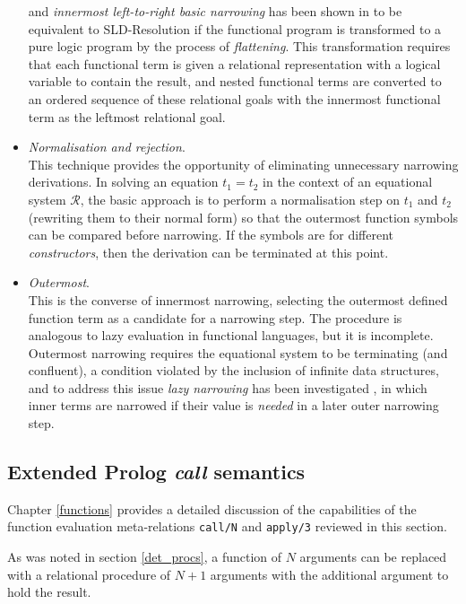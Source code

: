 \begin{itemize}
{  and \textit{innermost left-to-right basic narrowing} has been shown in 
  \cite{BGM88} to be equivalent to SLD-Resolution if the functional program is
  transformed to a pure logic program by the process of \textit{flattening}.  This
  transformation requires that each functional term is given a relational representation
  with a logical variable to contain the result, and nested functional terms are
  converted to an ordered sequence of these relational goals with the innermost functional
  term as the leftmost relational goal.
  }
\item{\textit{Normalisation and rejection}.\\
  This technique provides the opportunity of eliminating unnecessary narrowing
  derivations.  In solving an equation $t_1 = t_2$ in the context of an
  equational system $\mathcal{R}$, the basic approach is to perform a normalisation step
  on $t_1$ and $t_2$ (rewriting them to their normal form)
  so that the outermost function symbols can be compared
  before narrowing.  If the symbols are for different \textit{constructors}, then the
  derivation can be terminated at this point.
  }
\item{\textit{Outermost}.\\
  This is the converse of innermost narrowing, selecting the outermost defined function
  term as a candidate for a narrowing step.  The procedure is analogous to lazy
  evaluation in functional languages, but it is incomplete.  Outermost narrowing
  requires the equational system to be terminating (and confluent),  a condition
  violated by the inclusion of infinite data structures, and to address this issue
  \textit{lazy narrowing} has been investigated \cite{Red85}, in which inner terms
  are narrowed if their value is \textit{needed} in a later outer narrowing step.
  }
\end{itemize}

\subsection{Extended Prolog \textit{call} semantics}

Chapter \ref{functions} provides a detailed discussion of the capabilities of
the function evaluation meta-relations \texttt{call/N} and \texttt{apply/3} reviewed
in this section.

As was noted in section \ref{det_procs}, a function of $N$ arguments can be
replaced with a relational procedure of $N+1$ arguments with the additional
argument to hold the result.

